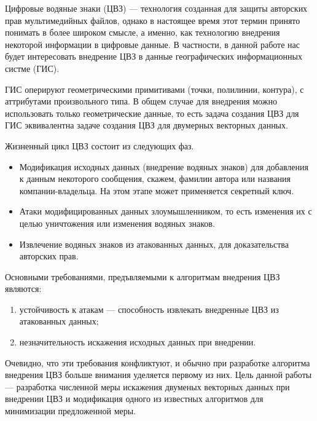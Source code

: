 \startprefacepage

Цифровые водяные знаки (ЦВЗ) --- технология созданная для защиты авторских прав мультимедийных файлов,
однако в настоящее время этот термин принято понимать в более широком смысле, а именно, как технологию
внедрения некоторой информации в цифровые данные. В частности, в данной работе нас будет интересовать
внедрение ЦВЗ в данные географических информационных систме (ГИС).

ГИС оперируют геометрическими примитивами (точки, полилинии, контура), с аттрибутами 
произвольного типа. В общем случае для внедрения можно использовать только геометрические данные,
то есть задача создания ЦВЗ для ГИС эквивалентна задаче создания ЦВЗ для двумерных векторных данных.

Жизненный цикл ЦВЗ состоит из следующих фаз.
\begin{itemize}
  \item Модификация исходных данных (внедрение водяных знаков) для добавления к данным 
  некоторого сообщения, скажем, фамилии автора или названия компании-владельца. 
  На этом этапе может применяется секретный ключ. 
  \item Атаки модифицированных данных злоумышленником, то есть изменения их с целью уничтожения 
  или изменения водяных знаков.
  \item Извлечение водяных знаков из атакованных данных, для доказательства авторских прав.
\end{itemize}

Основными требованиями, предъвляемыми к алгоритмам внедрения ЦВЗ являются:
\begin{enumerate}
  \item устойчивость к атакам --- способность извлекать внедренные ЦВЗ из атакованных данных;
  \item незначительность искажения исходных данных при внедрении.
\end{enumerate}

Очевидно, что эти требования конфликтуют, и обычно при разработке алгоритма внедрения ЦВЗ
больше внимания уделяется первому из них. Цель данной работы --- разработка численной меры искажения
двуменых векторных данных при внедрении ЦВЗ и модификация одного из известных алгоритмов
для минимизации предложенной меры.

